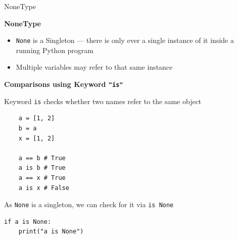 \documentclass[
	11pt, 
]{beamer}
\begin{document}

\begin{frame}[fragile]{NoneType} %

\textbf{NoneType}
\begin{itemize}
    \item \texttt{None} is a Singleton --- there is only ever a single instance of it inside a running Python program
    \item Multiple variables may refer to that same instance
\end{itemize}

\vspace{.2cm}

\textbf{Comparisons using Keyword \texttt{"is"}}

\vspace{.2cm}

Keyword \texttt{is} checks whether two names refer to the same object

\vspace{.4cm}

\begin{minipage}[t]{0.30\textwidth}
\begin{verbatim}
    a = [1, 2]
    b = a
    x = [1, 2]
    
    a == b # True
    a is b # True
    a == x # True
    a is x # False
\end{verbatim}
\end{minipage}
\hfill
\begin{minipage}[t]{0.50\textwidth}
As \texttt{None} is a singleton, we can check for it via \texttt{is None}

\begin{verbatim}
if a is None:
    print("a is None")
\end{verbatim}

\end{minipage}
\end{frame}

\end{document}
